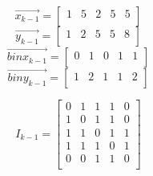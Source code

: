\documentclass{article}
\begin{document}
\begin{minipage}[t]{0.95\textwidth}
    \vspace{75pt} %
    \[
    \Vec{x_{k-1}} = 
    \begin{bmatrix}
    1 & 5 & 2 & 5 & 5\\
    \end{bmatrix}
    \]
    \[
    \Vec{y_{k-1}} = 
    \begin{bmatrix}
    1 & 2 & 5 & 5 & 8\\
    \end{bmatrix}
    \]
    \[
    \Vec{binx_{k-1}} = 
    \begin{bmatrix}
    0 & 1 & 0 & 1 & 1\\
    \end{bmatrix}
    \]
    \[
    \Vec{biny_{k-1}} = 
    \begin{bmatrix}
    1 & 2 & 1 & 1 & 2\\
    \end{bmatrix}
    \]
    
    \[
    I_{k-1} = 
    \begin{bmatrix}
    0 & 1 & 1 & 1 & 0\\
    1 & 0 & 1 & 1 & 0\\
    1 & 1 & 0 & 1 & 1\\
    1 & 1 & 1 & 0 & 1\\
    0 & 0 & 1 & 1 & 0\\
    \end{bmatrix}
    \]
\end{minipage}
\end{document}
